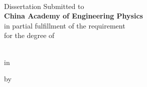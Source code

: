

\vspace{20pt}

\begin{center}
  \noindent
  \bfseries
  \thethesisdatecn
\end{center}

\clearpage

\begin{center}
  \bfseries
  \fontsize{20pt}{20pt} \selectfont
  \hspace*{\fill}\\
  \theentitle
\end{center}

\vspace{20pt}

\begin{center}
  Dissertation Submitted to\\
  \textbf{China Academy of Engineering Physics}\\
  in partial fulfillment of the requirement\\
  for the degree of\\
  \textbf{\thedgreelevelen}\\
\end{center}

\vspace{20pt}

\begin{center}
  in
  \\
  \textbf{\thefielden}
\end{center}
\vspace{20pt}
\begin{center}
  by\\
  \textbf{\theenauthor}
\end{center}


